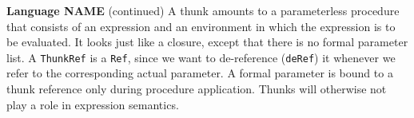 \begin{minipage}[t]{\sw}
\slidenumber
\LARGE
{\bf Language NAME} (continued)\exx
A thunk amounts to a parameterless procedure
that consists of an expression and an environment
in which the expression is to be evaluated.
It looks just like a closure,
except that there is no formal parameter list.\exx
\emm\Large{}\exx
\LARGE
A \verb'ThunkRef' is a \verb'Ref', since we want
to de-reference (\verb'deRef') it
whenever we refer to the corresponding actual parameter.
A formal parameter is bound to a thunk reference
only during procedure application.
Thunks will otherwise not play a role in expression semantics.
\end{minipage}

